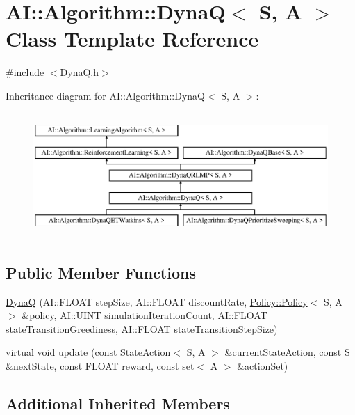 \hypertarget{classAI_1_1Algorithm_1_1DynaQ}{\section{A\-I\-:\-:Algorithm\-:\-:Dyna\-Q$<$ S, A $>$ Class Template Reference}
\label{classAI_1_1Algorithm_1_1DynaQ}
}


{\ttfamily \#include $<$Dyna\-Q.\-h$>$}

Inheritance diagram for A\-I\-:\-:Algorithm\-:\-:Dyna\-Q$<$ S, A $>$\-:\begin{figure}[H]
\begin{center}
\leavevmode
\includegraphics[height=4.794520cm]{classAI_1_1Algorithm_1_1DynaQ}
\end{center}
\end{figure}
\subsection*{Public Member Functions}
\begin{DoxyCompactItemize}
\item 
\hyperlink{classAI_1_1Algorithm_1_1DynaQ_aa543816270f72b2c4ac1f77fb818f792}{Dyna\-Q} (A\-I\-::\-F\-L\-O\-A\-T step\-Size, A\-I\-::\-F\-L\-O\-A\-T discount\-Rate, \hyperlink{classAI_1_1Algorithm_1_1Policy_1_1Policy}{Policy\-::\-Policy}$<$ S, A $>$ \&policy, A\-I\-::\-U\-I\-N\-T simulation\-Iteration\-Count, A\-I\-::\-F\-L\-O\-A\-T state\-Transition\-Greediness, A\-I\-::\-F\-L\-O\-A\-T state\-Transition\-Step\-Size)
\item 
virtual void \hyperlink{classAI_1_1Algorithm_1_1DynaQ_a4542226b17db4ed8a2c5ec17d37dc42f}{update} (const \hyperlink{classAI_1_1StateAction}{State\-Action}$<$ S, A $>$ \&current\-State\-Action, const S \&next\-State, const F\-L\-O\-A\-T reward, const set$<$ A $>$ \&action\-Set)
\end{DoxyCompactItemize}
\subsection*{Additional Inherited Members}


